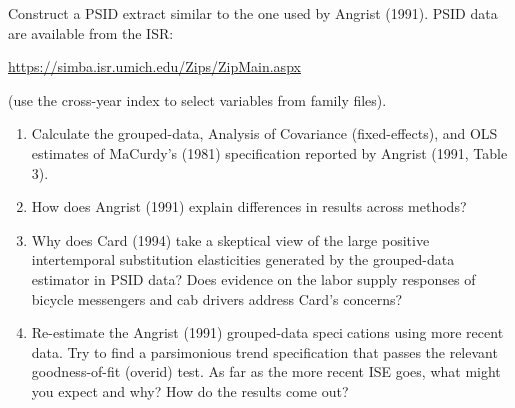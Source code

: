 
Construct a PSID extract similar to the one used by Angrist (1991). PSID data are available
from the ISR:

\href{https://simba.isr.umich.edu/Zips/ZipMain.aspx}{https://simba.isr.umich.edu/Zips/ZipMain.aspx}

(use the cross-year index to select variables from family files).
\begin{enumerate}
    \item Calculate the grouped-data, Analysis of Covariance (fixed-effects), and OLS estimates of MaCurdy's (1981) specification reported by Angrist (1991, Table 3).
    \item
     How does Angrist (1991) explain differences in results across methods?
    \item
    Why does Card (1994) take a skeptical view of the large positive intertemporal substitution
elasticities generated by the grouped-data estimator in PSID data? Does evidence on the
labor supply responses of bicycle messengers and cab drivers address Card's concerns?
    \item
    Re-estimate the Angrist (1991) grouped-data specications using more recent data. Try to
    find a parsimonious trend specification that passes the relevant goodness-of-fit (overid) test.
    As far as the more recent ISE goes, what might you expect and why? How do the results
    come out?
    
    
\end{enumerate}
